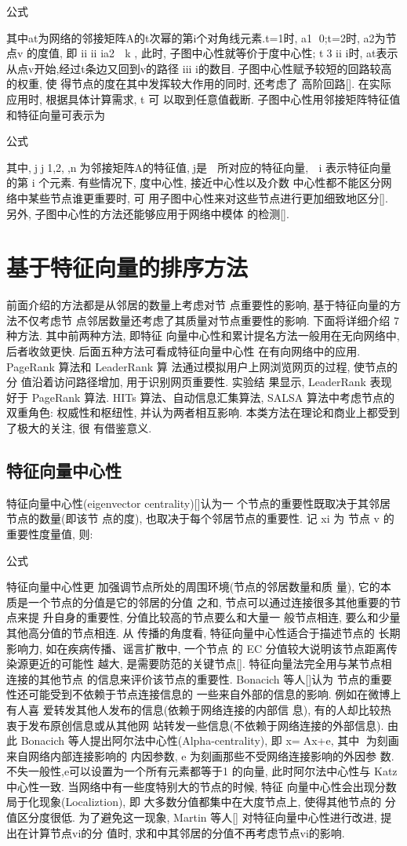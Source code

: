 			公式

			其中at为网络的邻接矩阵A的t次幂的第i个对角线元素.t=1时, a1 0;t=2时, a2为节点v 的度值, 即 ii ii ia2  k , 此时, 子图中心性就等价于度中心性; t3 ii i时, at表示从点v开始,经过t条边又回到v的路径 iii i的数目. 子图中心性赋予较短的回路较高的权重, 使 得节点的度在其中发挥较大作用的同时, 还考虑了 高阶回路[]. 在实际应用时, 根据具体计算需求, t 可 以取到任意值截断. 子图中心性用邻接矩阵特征值 和特征向量可表示为

			公式

			其中,jj1,2,,n为邻接矩阵A的特征值,j是  所对应的特征向量,  i 表示特征向量的第 i 个元素. 有些情况下, 度中心性, 接近中心性以及介数 中心性都不能区分网络中某些节点谁更重要时, 可 用子图中心性来对这些节点进行更加细致地区分[]. 另外, 子图中心性的方法还能够应用于网络中模体 的检测[].

\section{基于特征向量的排序方法}
前面介绍的方法都是从邻居的数量上考虑对节 点重要性的影响, 基于特征向量的方法不仅考虑节 点邻居数量还考虑了其质量对节点重要性的影响. 下面将详细介绍 7 种方法. 其中前两种方法, 即特征 向量中心性和累计提名方法一般用在无向网络中, 后者收敛更快. 后面五种方法可看成特征向量中心性 在有向网络中的应用. PageRank 算法和 LeaderRank 算 法通过模拟用户上网浏览网页的过程, 使节点的分 值沿着访问路径增加, 用于识别网页重要性. 实验结 果显示, LeaderRank 表现好于 PageRank 算法. HITs 算法、自动信息汇集算法, SALSA 算法中考虑节点的 双重角色: 权威性和枢纽性, 并认为两者相互影响. 本类方法在理论和商业上都受到了极大的关注, 很 有借鉴意义.
\subsection{特征向量中心性}
特征向量中心性(eigenvector centrality)[]认为一 个节点的重要性既取决于其邻居节点的数量(即该节 点的度), 也取决于每个邻居节点的重要性. 记 xi 为 节点 v 的重要性度量值, 则:

			公式

			特征向量中心性更 加强调节点所处的周围环境(节点的邻居数量和质 量), 它的本质是一个节点的分值是它的邻居的分值 之和, 节点可以通过连接很多其他重要的节点来提 升自身的重要性, 分值比较高的节点要么和大量一 般节点相连, 要么和少量其他高分值的节点相连. 从 传播的角度看, 特征向量中心性适合于描述节点的 长期影响力, 如在疾病传播、谣言扩散中, 一个节点 的 EC 分值较大说明该节点距离传染源更近的可能性 越大, 是需要防范的关键节点[].
			特征向量法完全用与某节点相连接的其他节点 的信息来评价该节点的重要性. Bonacich 等人[]认为 节点的重要性还可能受到不依赖于节点连接信息的 一些来自外部的信息的影响. 例如在微博上有人喜 爱转发其他人发布的信息(依赖于网络连接的内部信 息), 有的人却比较热衷于发布原创信息或从其他网 站转发一些信息(不依赖于网络连接的外部信息). 由 此 Bonacich 等人提出阿尔法中心性(Alpha-centrality), 即 x=Ax+e, 其中 为刻画来自网络内部连接影响的 内因参数, e 为刻画那些不受网络连接影响的外因参 数. 不失一般性,e可以设置为一个所有元素都等于1 的向量, 此时阿尔法中心性与 Katz 中心性一致.
			当网络中有一些度特别大的节点的时候, 特征 向量中心性会出现分数局于化现象(Localiztion), 即 大多数分值都集中在大度节点上, 使得其他节点的 分值区分度很低. 为了避免这一现象, Martin 等人[] 对特征向量中心性进行改进, 提出在计算节点vi的分 值时, 求和中其邻居的分值不再考虑节点vi的影响.
